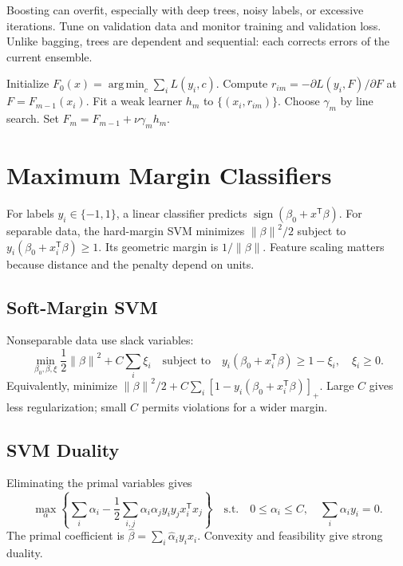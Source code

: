 \documentclass[12pt,oneside]{book}
\numberwithin{equation}{section}
\theoremstyle{definition}
\theoremstyle{plain}
\theoremstyle{remark}
\newcommand{\argmin}{\operatorname*{arg\,min}}
\newcommand{\norm}[1]{\left\lVert #1 \right\rVert}
\begin{document}
Boosting can overfit, especially with deep trees, noisy labels, or excessive
iterations. Tune on validation data and monitor training and validation loss.
Unlike bagging, trees are dependent and sequential: each corrects errors of
the current ensemble.

\begin{algorithm}[H]
\caption{Gradient boosting}
\begin{algorithmic}[1]
\State Initialize $F_0(x)=\argmin_c\sum_iL(y_i,c)$.
  \State Compute $r_{im}=-\partial L(y_i,F)/\partial F$ at
  $F=F_{m-1}(x_i)$.
  \State Fit a weak learner $h_m$ to $\{(x_i,r_{im})\}$.
  \State Choose $\gamma_m$ by line search.
  \State Set $F_m=F_{m-1}+\nu\gamma_mh_m$.
\EndFor
\end{algorithmic}
\end{algorithm}
\section{Maximum Margin Classifiers}

For labels $y_i\in\{-1,1\}$, a linear classifier predicts
$\operatorname{sign}(\beta_0+x^\mathsf T\beta)$. For separable data, the
hard-margin SVM minimizes $\norm\beta^2/2$ subject to
$y_i(\beta_0+x_i^\mathsf T\beta)\geq1$. Its geometric margin is
$1/\norm\beta$. Feature scaling matters because distance and the penalty
depend on units.

\subsection{Soft-Margin SVM}

Nonseparable data use slack variables:
\begin{equation}
 \min_{\beta_0,\beta,\xi}\frac12\norm\beta^2+C\sum_i\xi_i
 \quad\text{subject to}\quad
 y_i(\beta_0+x_i^\mathsf T\beta)\geq1-\xi_i,\quad \xi_i\geq0.
 \label{eq:soft-margin-primal}
\end{equation}
Equivalently, minimize $\norm\beta^2/2+
C\sum_i[1-y_i(\beta_0+x_i^\mathsf T\beta)]_+$. Large $C$ gives less
regularization; small $C$ permits violations for a wider margin.

\subsection{SVM Duality}

Eliminating the primal variables gives
\begin{equation}
 \max_{\alpha}\left\{\sum_i\alpha_i-\frac12\sum_{i,j}
 \alpha_i\alpha_jy_iy_jx_i^\mathsf Tx_j\right\}
 \quad\text{s.t.}\quad
 0\leq\alpha_i\leq C,\quad \sum_i\alpha_iy_i=0.
 \label{eq:svm-dual}
\end{equation}
The primal coefficient is
$\widehat\beta=\sum_i\widehat\alpha_i y_ix_i$. Convexity and feasibility give
strong duality.
\end{document}
